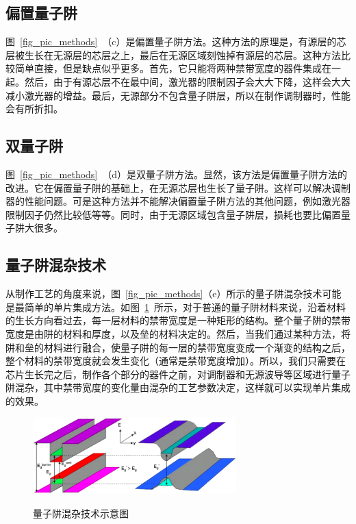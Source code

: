\documentclass{ZJUthesis}
\begin{document}
\subsection{偏置量子阱}

图~\ref{fig_pic_methods}~（c）是偏置量子阱方法。这种方法的原理是，有源层的芯层被生长在无源层的芯层之上，最后在无源区域刻蚀掉有源层的芯层。这种方法比较简单直接，但是缺点似乎更多。首先，它只能将两种禁带宽度的器件集成在一起。然后，由于有源芯层不在最中间，激光器的限制因子会大大下降，这样会大大减小激光器的增益。最后，无源部分不包含量子阱层，所以在制作调制器时，性能会有所折扣。

\subsection{双量子阱}

图~\ref{fig_pic_methods}~（d）是双量子阱方法。显然，该方法是偏置量子阱方法的改进。它在偏置量子阱的基础上，在无源芯层也生长了量子阱。这样可以解决调制器的性能问题。可是这种方法并不能解决偏置量子阱方法的其他问题，例如激光器限制因子仍然比较低等等。同时，由于无源区域包含量子阱层，损耗也要比偏置量子阱大很多。

\subsection{量子阱混杂技术}

从制作工艺的角度来说，图~\ref{fig_pic_methods}（e）所示的量子阱混杂技术可能是最简单的单片集成方法。如图~\ref{fig_qwi}~所示，对于普通的量子阱材料来说，沿着材料的生长方向看过去，每一层材料的禁带宽度是一种矩形的结构。整个量子阱的禁带宽度是由阱的材料和厚度，以及垒的材料决定的。然后，当我们通过某种方法，将阱和垒的材料进行融合，使量子阱的每一层的禁带宽度变成一个渐变的结构之后，整个材料的禁带宽度就会发生变化（通常是禁带宽度增加）。所以，我们只需要在芯片生长完之后，制作各个部分的器件之前，对调制器和无源波导等区域进行量子阱混杂，其中禁带宽度的变化量由混杂的工艺参数决定，这样就可以实现单片集成的效果。

\begin{figure}[htbp]
  \centering
  \includegraphics[width=0.7\textwidth]{./Pictures/qwi.eps}\\
  \caption{量子阱混杂技术示意图}
  \label{fig_qwi}
\end{figure}
\end{document}
